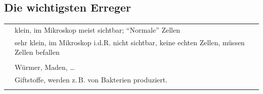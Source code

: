 




\subsection{Die wichtigsten Erreger}
\label{topic:infektion-erreger}

\begin{table}[H]

\begin{tabulary}{\linewidth}{LL}
&
\\\midrule\addlinespace
{}
&
klein, im Mikroskop meist sichtbar;
        {\textquotedblleft}Normale{\textquotedblright} Zellen
\\\addlinespace
{}
&
sehr klein, im Mikroskop i.d.R. nicht
        sichtbar, keine echten Zellen, müssen Zellen befallen
\\\addlinespace
{}
&

\\\addlinespace
{}
&
Würmer, Maden, \ldots
\\\addlinespace
{}
&
Giftstoffe, werden z.\,B. von Bakterien produziert.
\\\addlinespace\bottomrule
\end{tabulary}
\end{table}

% 
% 
% 
% 
% 
% 
% 

